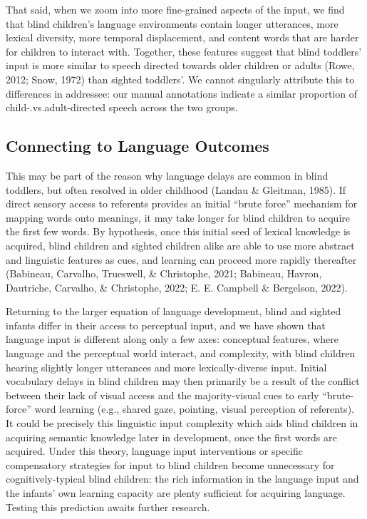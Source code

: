 \documentclass[
  man]{apa6}
\begin{document}
That said, when we zoom into more fine-grained aspects of the input, we find that blind children's language environments contain longer utterances, more lexical diversity, more temporal displacement, and content words that are harder for children to interact with. Together, these features suggest that blind toddlers' input is more similar to speech directed towards older children or adults (Rowe, 2012; Snow, 1972) than sighted toddlers'. We cannot singularly attribute this to differences in addressee: our manual annotations indicate a similar proportion of child-.vs.adult-directed speech across the two groups.

\hypertarget{connecting-to-language-outcomes}{%
\subsection{Connecting to Language Outcomes}\label{connecting-to-language-outcomes}}

This may be part of the reason why language delays are common in blind toddlers, but often resolved in older childhood (Landau \& Gleitman, 1985). If direct sensory access to referents provides an initial ``brute force'' mechanism for mapping words onto meanings, it may take longer for blind children to acquire the first few words. By hypothesis, once this initial seed of lexical knowledge is acquired, blind children and sighted children alike are able to use more abstract and linguistic features as cues, and learning can proceed more rapidly thereafter (Babineau, Carvalho, Trueswell, \& Christophe, 2021; Babineau, Havron, Dautriche, Carvalho, \& Christophe, 2022; E. E. Campbell \& Bergelson, 2022).

Returning to the larger equation of language development, blind and sighted infants differ in their access to perceptual input, and we have shown that language input is different along only a few axes: conceptual features, where language and the perceptual world interact, and complexity, with blind children hearing slightly longer utterances and more lexically-diverse input. Initial vocabulary delays in blind children may then primarily be a result of the conflict between their lack of visual access and the majority-visual cues to early ``brute-force'' word learning (e.g., shared gaze, pointing, visual perception of referents). It could be precisely this linguistic input complexity which aids blind children in acquiring semantic knowledge later in development, once the first words are acquired. Under this theory, language input interventions or specific compensatory strategies for input to blind children become unnecessary for cognitively-typical blind children: the rich information in the language input and the infants' own learning capacity are plenty sufficient for acquiring language. Testing this prediction awaits further research.
\end{document}
